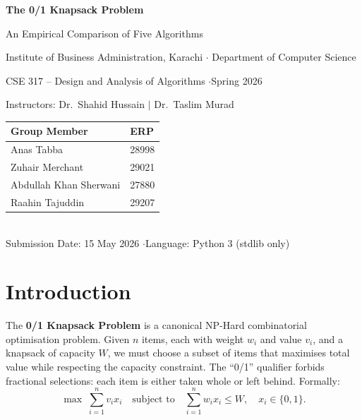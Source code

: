 \documentclass[11pt, a4paper]{article}
\begin{document}
\begin{center}
{\LARGE\bfseries\sffamily The 0/1 Knapsack Problem\par}
\vspace{2pt}
{\large An Empirical Comparison of Five Algorithms\par}
\vspace{6pt}
{\normalsize Institute of Business Administration, Karachi \quad$\cdot$\quad
Department of Computer Science\par}
{\normalsize CSE 317 -- Design and Analysis of Algorithms \quad$\cdot$\quad Spring 2026\par}
{\small Instructors: Dr.\ Shahid Hussain \quad $\vert$ \quad Dr.\ Taslim Murad\par}
\vspace{6pt}
\begin{tabular}{ll}
\toprule
\textbf{Group Member} & \textbf{ERP} \\
\midrule
Anas Tabba              & 28998 \\
Zuhair Merchant         & 29021 \\
Abdullah Khan Sherwani  & 27880 \\
Raahin Tajuddin         & 29207 \\
\bottomrule
\end{tabular}\\[3pt]
{\small Submission Date: 15 May 2026 \quad$\cdot$\quad Language: Python 3 (stdlib only)}
\end{center}

\section{Introduction}

The \textbf{0/1 Knapsack Problem} is a canonical NP-Hard combinatorial
optimisation problem. Given $n$ items, each with weight $w_i$ and value $v_i$,
and a knapsack of capacity $W$, we must choose a subset of items that maximises
total value while respecting the capacity constraint. The ``0/1'' qualifier
forbids fractional selections: each item is either taken whole or left behind.
Formally:
\begin{equation}
\max \;\sum_{i=1}^{n} v_i x_i \quad
\text{subject to}\quad \sum_{i=1}^{n} w_i x_i \le W,\quad x_i \in \{0,1\}.
\label{eq:knap}
\end{equation}
\end{document}
